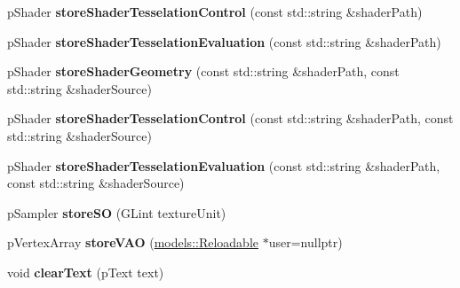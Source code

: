 \begin{DoxyCompactItemize}
\item 
\hypertarget{classfillwave_1_1Engine_a7157ddacfcb0dc57f905dd55c5e8298c}{}p\+Shader {\bfseries store\+Shader\+Tesselation\+Control} (const std\+::string \&shader\+Path)\label{classfillwave_1_1Engine_a7157ddacfcb0dc57f905dd55c5e8298c}

\item 
\hypertarget{classfillwave_1_1Engine_a92e54f7f0ff3fb02d39fcff1e24508fc}{}p\+Shader {\bfseries store\+Shader\+Tesselation\+Evaluation} (const std\+::string \&shader\+Path)\label{classfillwave_1_1Engine_a92e54f7f0ff3fb02d39fcff1e24508fc}

\item 
\hypertarget{classfillwave_1_1Engine_a0397857b8de836c68499c88612756e61}{}p\+Shader {\bfseries store\+Shader\+Geometry} (const std\+::string \&shader\+Path, const std\+::string \&shader\+Source)\label{classfillwave_1_1Engine_a0397857b8de836c68499c88612756e61}

\item 
\hypertarget{classfillwave_1_1Engine_ac076814ab5f44ce033fa0bc1cb8e0500}{}p\+Shader {\bfseries store\+Shader\+Tesselation\+Control} (const std\+::string \&shader\+Path, const std\+::string \&shader\+Source)\label{classfillwave_1_1Engine_ac076814ab5f44ce033fa0bc1cb8e0500}

\item 
\hypertarget{classfillwave_1_1Engine_af226a5bf69d8380adb04d3e53ee41689}{}p\+Shader {\bfseries store\+Shader\+Tesselation\+Evaluation} (const std\+::string \&shader\+Path, const std\+::string \&shader\+Source)\label{classfillwave_1_1Engine_af226a5bf69d8380adb04d3e53ee41689}

\item 
\hypertarget{classfillwave_1_1Engine_ae3619e901e208d1c61ebced3b18997e3}{}p\+Sampler {\bfseries store\+S\+O} (G\+Lint texture\+Unit)\label{classfillwave_1_1Engine_ae3619e901e208d1c61ebced3b18997e3}

\item 
\hypertarget{classfillwave_1_1Engine_a40bb53bfae5e06d4238f5a07c4f30a87}{}p\+Vertex\+Array {\bfseries store\+V\+A\+O} (\hyperlink{classfillwave_1_1models_1_1Reloadable}{models\+::\+Reloadable} $\ast$user=nullptr)\label{classfillwave_1_1Engine_a40bb53bfae5e06d4238f5a07c4f30a87}

\item 
\hypertarget{classfillwave_1_1Engine_a1f7390160abe6d9ef530b27ac8180017}{}void {\bfseries clear\+Text} (p\+Text text)\label{classfillwave_1_1Engine_a1f7390160abe6d9ef530b27ac8180017}


\end{DoxyCompactItemize}
